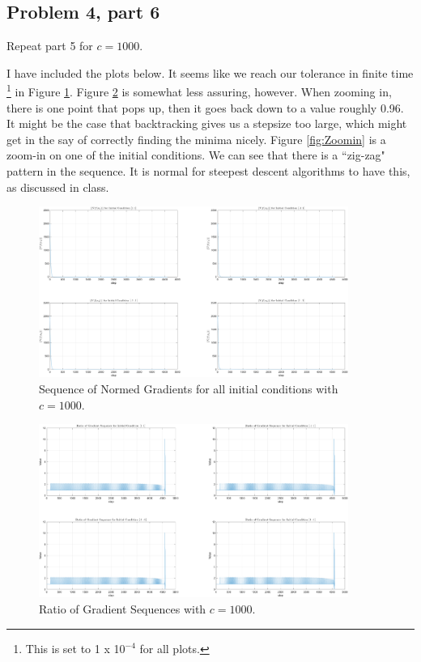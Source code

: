 \subsection{Problem 4, part 6}
Repeat part 5 for $c = 1000$.
\partbreak
\begin{solution}

    I have included the plots below. It seems like we reach our tolerance in finite time \footnote{This is set to 1 x 10$^{-4}$ for all plots.} in Figure \ref{fig:NormGradient1000}. Figure \ref{fig:PlotSeq1000} is somewhat less assuring, however. When zooming in, there is one point that pops up, then it goes back down to a value roughly 0.96. It might be the case that backtracking gives us a stepsize too large, which might get in the say of correctly finding the minima nicely. Figure \ref{fig:Zoomin} is a zoom-in on one of the initial conditions. We can see that there is a ``zig-zag" pattern in the sequence. It is normal for steepest descent algorithms to have this, as discussed in class. 
\end{solution}
\vspace{2cm}
\begin{figure}[!h]
    \centering
    \includegraphics[width = 0.9\textwidth]{Plots/NormGradient1000.png}
    \caption{Sequence of Normed Gradients for all initial conditions with $c = 1000$.}
    \label{fig:NormGradient1000}
\end{figure}

\clearpage
\newpage
\begin{figure}
    \centering
    \includegraphics[width = 0.9\textwidth]{Plots/RatioSeq1000.png}
    \caption{Ratio of Gradient Sequences with $c = 1000$.}
    \label{fig:PlotSeq1000}
\end{figure}

